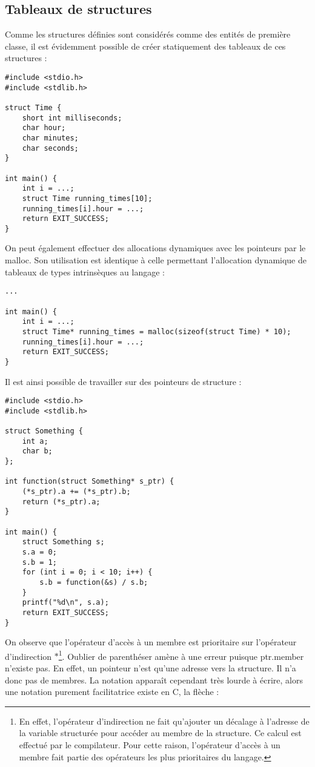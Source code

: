 \documentclass[../../../main.tex]{subfiles}
\begin{document}
\subsection{Tableaux de structures}
\label{sub:tableaux_de_structures}
Comme les structures définies sont considérés comme des entités de première classe, il est évidemment possible de créer statiquement des tableaux de ces structures :
\begin{verbatim}
#include <stdio.h>
#include <stdlib.h>

struct Time {
	short int milliseconds;
	char hour;
	char minutes;
	char seconds;
}

int main() {
	int i = ...;
	struct Time running_times[10];
	running_times[i].hour = ...;
	return EXIT_SUCCESS;
}
\end{verbatim}
On peut également effectuer des allocations dynamiques avec les pointeurs par le \textsf{malloc}. Son utilisation est identique à celle permettant l'allocation dynamique de tableaux de types intrinsèques au langage :
\begin{verbatim}
...

int main() {
	int i = ...;
	struct Time* running_times = malloc(sizeof(struct Time) * 10);
	running_times[i].hour = ...;
	return EXIT_SUCCESS;
}
\end{verbatim}
Il est ainsi possible de travailler sur des pointeurs de structure :
\begin{verbatim}
#include <stdio.h>
#include <stdlib.h>

struct Something {
	int a;
	char b;
};

int function(struct Something* s_ptr) {
	(*s_ptr).a += (*s_ptr).b;
	return (*s_ptr).a;
}

int main() {
	struct Something s;
	s.a = 0;
	s.b = 1;
	for (int i = 0; i < 10; i++) {
		s.b = function(&s) / s.b;
	}
	printf("%d\n", s.a);
	return EXIT_SUCCESS;
}
\end{verbatim}
On observe que l'opérateur d'accès à un membre est prioritaire sur l'opérateur d'indirection $*$\footnote{En effet, l'opérateur d'indirection ne fait qu'ajouter un décalage à l'adresse de la variable structurée pour accéder au membre de la structure. Ce calcul est effectué par le compilateur. Pour cette raison, l'opérateur d'accès à un membre fait partie des opérateurs les plus prioritaires du langage.}. Oublier de parenthéser amène à une erreur puisque \textsf{ptr.member} n'existe pas. En effet, un pointeur n'est qu'une adresse vers la structure. Il n'a donc pas de membres. \newline
La notation apparaît cependant très lourde à écrire, alors une notation purement facilitatrice existe en C, la flèche :
 
\end{document}
